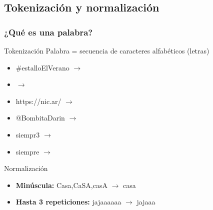 
\subsection{Tokenización y normalización}

\begin{frame}[c]\frametitle{¿Qué es una palabra?}
    \begin{block}{Tokenización}
    Palabra = secuencia de caracteres alfabéticos (letras)
    \begin{multicols}{2}
    \begin{itemize}
        \item \#estalloElVerano $\rightarrow$ \xmark
        \item \smiley{} \frownie{} $\rightarrow$ \xmark
        \item https://nic.ar/ $\rightarrow$ \xmark
        \item @BombitaDarin $\rightarrow$ \xmark
        \item siempr3 $\rightarrow$ \xmark
        \item siempre $\rightarrow$ \cmark
    \end{itemize}

    \end{multicols}
    \end{block}

    \begin{block}{Normalización}
    \begin{itemize}
        \item \textbf{Minúscula:} Casa,CaSA,casA $\rightarrow$ casa
        \item \textbf{Hasta 3 repeticiones:} jajaaaaaa $\rightarrow$ jajaaa
    \end{itemize}
    \end{block}

\end{frame}

